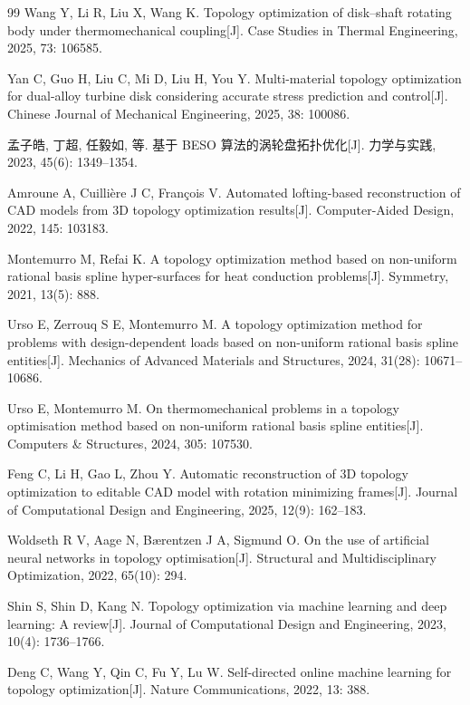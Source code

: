 \documentclass{FRB-style}
\begin{document}
\begin{thebibliography}{99}
Wang Y, Li R, Liu X, Wang K. Topology optimization of disk--shaft rotating body under thermomechanical coupling[J]. Case Studies in Thermal Engineering, 2025, 73: 106585.

Yan C, Guo H, Liu C, Mi D, Liu H, You Y. Multi-material topology optimization for dual-alloy turbine disk considering accurate stress prediction and control[J]. Chinese Journal of Mechanical Engineering, 2025, 38: 100086.

孟子皓, 丁超, 任毅如, 等. 基于 BESO 算法的涡轮盘拓扑优化[J]. 力学与实践, 2023, 45(6): 1349--1354.

Amroune A, Cuillière J C, François V. Automated lofting-based reconstruction of CAD models from 3D topology optimization results[J]. Computer-Aided Design, 2022, 145: 103183.

Montemurro M, Refai K. A topology optimization method based on non-uniform rational basis spline hyper-surfaces for heat conduction problems[J]. Symmetry, 2021, 13(5): 888.

Urso E, Zerrouq S E, Montemurro M. A topology optimization method for problems with design-dependent loads based on non-uniform rational basis spline entities[J]. Mechanics of Advanced Materials and Structures, 2024, 31(28): 10671--10686.

Urso E, Montemurro M. On thermomechanical problems in a topology optimisation method based on non-uniform rational basis spline entities[J]. Computers \& Structures, 2024, 305: 107530.

Feng C, Li H, Gao L, Zhou Y. Automatic reconstruction of 3D topology optimization to editable CAD model with rotation minimizing frames[J]. Journal of Computational Design and Engineering, 2025, 12(9): 162--183.

Woldseth R V, Aage N, B{\ae}rentzen J A, Sigmund O. On the use of artificial neural networks in topology optimisation[J]. Structural and Multidisciplinary Optimization, 2022, 65(10): 294.

Shin S, Shin D, Kang N. Topology optimization via machine learning and deep learning: A review[J]. Journal of Computational Design and Engineering, 2023, 10(4): 1736--1766.

Deng C, Wang Y, Qin C, Fu Y, Lu W. Self-directed online machine learning for topology optimization[J]. Nature Communications, 2022, 13: 388.


\end{thebibliography}
\end{document}
